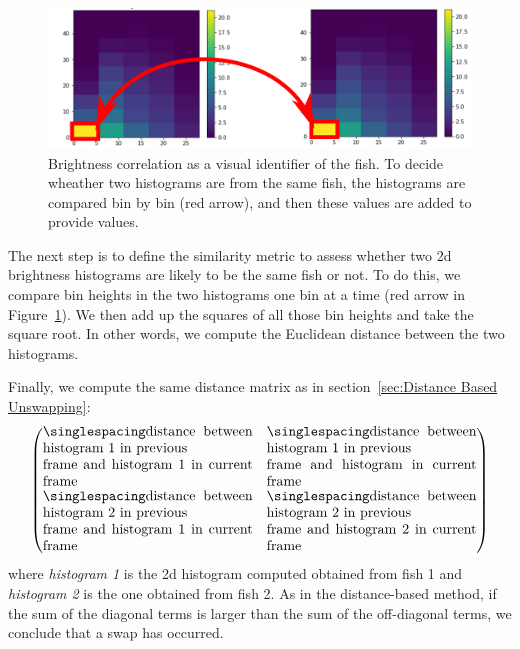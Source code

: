 \documentclass{article}
\begin{document}
\begin{figure}[H]
	\centering
	\includegraphics[width=\linewidth]{twoHist}
	\caption{Brightness correlation as a visual identifier of the fish. To decide wheather two histograms are from the same fish, the histograms are compared bin by bin (red arrow), and then these values are added to provide values.}
	\label{fig:singleHist}
\end{figure}

The next step is to define the similarity metric to assess whether two 2d brightness histograms are likely to be the same fish or not. To do this, we compare bin heights in the two histograms one bin at a time (red arrow in Figure~\ref{fig:singleHist}). We then add up the squares of all those bin heights and take the square root. In other words, we compute the Euclidean distance between the two histograms.

Finally, we compute the same distance matrix as in section~\ref{sec:Distance Based Unswapping}:
\begin{equation}
	\begin{pmatrix}
	\text{\myMatrixItem{distance between histogram 1 in previous \\ frame and histogram 1 in current frame}} 
	& \text{\myMatrixItem{distance between histogram 1 in previous \\ frame and histogram in current frame}} 
	\\
	\text{\myMatrixItem{distance between histogram 2 in previous \\ frame and histogram 1 in current frame}} 
	& \text{\myMatrixItem{distance between histogram 2 in previous \\ frame and histogram 2 in current frame}} 
	\end{pmatrix}
	\nonumber
\end{equation} 
where \emph{histogram 1} is the 2d histogram computed obtained from fish 1 and \emph{histogram 2} is the one obtained from fish 2.
As in the distance-based method, if the sum of the diagonal terms is larger than the sum of the off-diagonal terms, we conclude that a swap has occurred.
\end{document}

